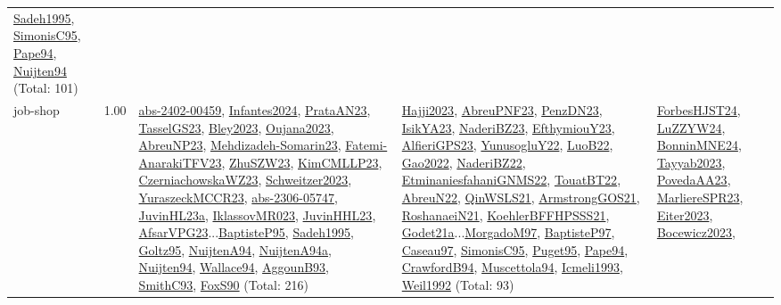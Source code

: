 {\begin{longtable}{p{3cm}r>{\raggedright\arraybackslash}p{6cm}>{\raggedright\arraybackslash}p{6cm}>{\raggedright\arraybackslash}p{8cm}}
\hyperref[detail:Sadeh1995]{Sadeh1995}, \hyperref[detail:SimonisC95]{SimonisC95}, \hyperref[detail:Pape94]{Pape94}, \hyperref[detail:Nuijten94]{Nuijten94} (Total: 101)\\
\index{job-shop}\index{Concepts!job-shop}job-shop &  1.00 & \hyperref[detail:abs-2402-00459]{abs-2402-00459}, \hyperref[detail:Infantes2024]{Infantes2024}, \hyperref[detail:PrataAN23]{PrataAN23}, \hyperref[detail:TasselGS23]{TasselGS23}, \hyperref[detail:Bley2023]{Bley2023}, \hyperref[detail:Oujana2023]{Oujana2023}, \hyperref[detail:AbreuNP23]{AbreuNP23}, \hyperref[detail:Mehdizadeh-Somarin23]{Mehdizadeh-Somarin23}, \hyperref[detail:Fatemi-AnarakiTFV23]{Fatemi-AnarakiTFV23}, \hyperref[detail:ZhuSZW23]{ZhuSZW23}, \hyperref[detail:KimCMLLP23]{KimCMLLP23}, \hyperref[detail:CzerniachowskaWZ23]{CzerniachowskaWZ23}, \hyperref[detail:Schweitzer2023]{Schweitzer2023}, \hyperref[detail:YuraszeckMCCR23]{YuraszeckMCCR23}, \hyperref[detail:abs-2306-05747]{abs-2306-05747}, \hyperref[detail:JuvinHL23a]{JuvinHL23a}, \hyperref[detail:IklassovMR023]{IklassovMR023}, \hyperref[detail:JuvinHHL23]{JuvinHHL23}, \hyperref[detail:AfsarVPG23]{AfsarVPG23}...\hyperref[detail:BaptisteP95]{BaptisteP95}, \hyperref[detail:Sadeh1995]{Sadeh1995}, \hyperref[detail:Goltz95]{Goltz95}, \hyperref[detail:NuijtenA94]{NuijtenA94}, \hyperref[detail:NuijtenA94a]{NuijtenA94a}, \hyperref[detail:Nuijten94]{Nuijten94}, \hyperref[detail:Wallace94]{Wallace94}, \hyperref[detail:AggounB93]{AggounB93}, \hyperref[detail:SmithC93]{SmithC93}, \hyperref[detail:FoxS90]{FoxS90} (Total: 216) & \hyperref[detail:Hajji2023]{Hajji2023}, \hyperref[detail:AbreuPNF23]{AbreuPNF23}, \hyperref[detail:PenzDN23]{PenzDN23}, \hyperref[detail:IsikYA23]{IsikYA23}, \hyperref[detail:NaderiBZ23]{NaderiBZ23}, \hyperref[detail:EfthymiouY23]{EfthymiouY23}, \hyperref[detail:AlfieriGPS23]{AlfieriGPS23}, \hyperref[detail:YunusogluY22]{YunusogluY22}, \hyperref[detail:LuoB22]{LuoB22}, \hyperref[detail:Gao2022]{Gao2022}, \hyperref[detail:NaderiBZ22]{NaderiBZ22}, \hyperref[detail:EtminaniesfahaniGNMS22]{EtminaniesfahaniGNMS22}, \hyperref[detail:TouatBT22]{TouatBT22}, \hyperref[detail:AbreuN22]{AbreuN22}, \hyperref[detail:QinWSLS21]{QinWSLS21}, \hyperref[detail:ArmstrongGOS21]{ArmstrongGOS21}, \hyperref[detail:RoshanaeiN21]{RoshanaeiN21}, \hyperref[detail:KoehlerBFFHPSSS21]{KoehlerBFFHPSSS21}, \hyperref[detail:Godet21a]{Godet21a}...\hyperref[detail:MorgadoM97]{MorgadoM97}, \hyperref[detail:BaptisteP97]{BaptisteP97}, \hyperref[detail:Caseau97]{Caseau97}, \hyperref[detail:SimonisC95]{SimonisC95}, \hyperref[detail:Puget95]{Puget95}, \hyperref[detail:Pape94]{Pape94}, \hyperref[detail:CrawfordB94]{CrawfordB94}, \hyperref[detail:Muscettola94]{Muscettola94}, \hyperref[detail:Icmeli1993]{Icmeli1993}, \hyperref[detail:Weil1992]{Weil1992} (Total: 93) & \hyperref[detail:ForbesHJST24]{ForbesHJST24}, \hyperref[detail:LuZZYW24]{LuZZYW24}, \hyperref[detail:BonninMNE24]{BonninMNE24}, \hyperref[detail:Tayyab2023]{Tayyab2023}, \hyperref[detail:PovedaAA23]{PovedaAA23}, \hyperref[detail:MarliereSPR23]{MarliereSPR23}, \hyperref[detail:Eiter2023]{Eiter2023}, \hyperref[detail:Bocewicz2023]{Bocewicz2023}, 
\end{longtable}}
